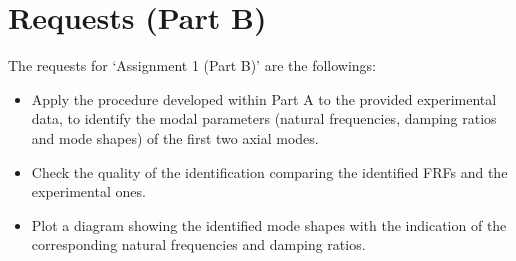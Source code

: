 \section{Requests (Part B)}
\label{sec:requests_part_B}

The requests for `Assignment 1 (Part B)' are the followings:

\begin{itemize}
    \item Apply the procedure developed within Part A to the provided experimental data, to identify the modal parameters (natural frequencies, damping ratios and mode shapes) of the first two axial modes.
    \item Check the quality of the identification comparing the identified FRFs and the experimental ones.
    \item Plot a diagram showing the identified mode shapes with the indication of the corresponding natural frequencies and damping ratios.
\end{itemize}
